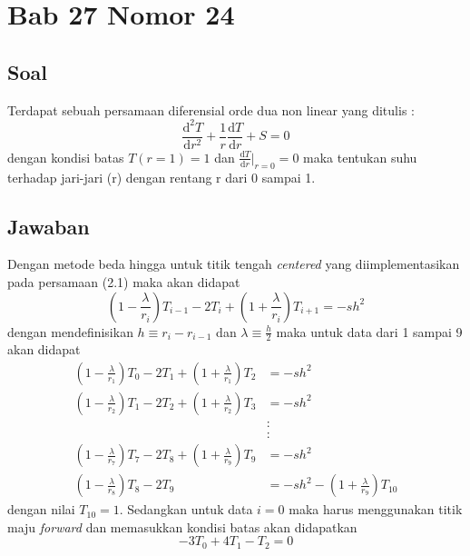 \documentclass[a4paper,12pt]{article}
\numberwithin{equation}{section} %
\begin{document}
\newpage
\section{Bab 27 Nomor 24}
\subsection{Soal}
Terdapat sebuah persamaan diferensial orde dua non linear yang ditulis :
\begin{equation}
\frac{\mathrm{d}^2 T}{\mathrm{d} r^2} + \frac{1}{r}\frac{\mathrm{d} T}{\mathrm{d} r} + S = 0
\end{equation}
dengan kondisi batas $T(r=1)=1$ dan $\frac{\mathrm{d} T}{\mathrm{d} r}\big|_{r=0} = 0$ maka tentukan suhu terhadap jari-jari (r) dengan rentang r dari 0 sampai 1.
\subsection{Jawaban}
Dengan metode beda hingga untuk titik tengah \textit{centered} yang diimplementasikan pada persamaan (2.1) maka akan didapat
\begin{equation}
\left(1-\frac{\lambda}{r_i} \right )T_{i-1} -2T_i + \left(1+\frac{\lambda}{r_i} \right )T_{i+1}=-sh^2
\end{equation}
dengan mendefinisikan $h \equiv r_i - r_{i-1}$ dan $\lambda \equiv \frac{h}{2}$ maka untuk data dari 1 sampai 9 akan didapat
\begin{align*}
\left(1-\frac{\lambda}{r_1} \right )T_{0} -2T_1 + \left(1+\frac{\lambda}{r_1} \right )T_{2}&=-sh^2 \tag{i=1}\\ 
\left(1-\frac{\lambda}{r_2} \right )T_{1} -2T_2 + \left(1+\frac{\lambda}{r_2} \right )T_{3}&=-sh^2 \tag{i=2}\\ 
 &: \\ 
 &: \\ 
\left(1-\frac{\lambda}{r_7} \right )T_{7} -2T_8 + \left(1+\frac{\lambda}{r_9} \right )T_{9}&=-sh^2 \tag{i=8}\\ 
\left(1-\frac{\lambda}{r_8} \right )T_{8} -2T_9 &=-sh^2- \left(1+\frac{\lambda}{r_9} \right )T_{10} \tag{i=9}
\end{align*}
dengan nilai $T_{10}=1$. Sedangkan untuk data $i=0$ maka harus menggunakan titik maju \textit{forward} dan memasukkan kondisi batas akan didapatkan
\begin{equation}
-3T_0 + 4T_1 - T_2 = 0	\tag{i=0}
\end{equation}
\end{document}
